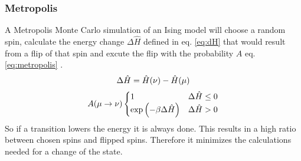     \subsubsection{Metropolis}
        A Metropolis Monte Carlo\cite{Metropolis1953} simulation of an
        Ising model will choose a random spin, calculate the energy change
        \(\Delta \hat H\) defined in eq. \eqref{eq:dH} that would result
        from a flip of that spin and excute the flip with the probability \(A\)
        eq. \eqref{eq:metropolis} \cite{NewmanBarkema1999} \cite{Katzgraber2011}.
        \begin{equation}
            \Delta \hat H = \hat H(\nu) - \hat H(\mu)\\
            \label{eq:dH}
        \end{equation}
        \begin{equation}
            A(\mu \to \nu)
            \begin{cases}
                1                                 & \Delta \hat H \le 0 \\
                \exp{\ensuremath{\left(-\beta \Delta \hat H\right)}} & \Delta \hat H > 0
            \end{cases}
            \label{eq:metropolis}
        \end{equation}
        So if a transition lowers the energy it is always done. This
        results in a high ratio between chosen spins and flipped spins.
        Therefore it minimizes the calculations needed for a change of
        the state.

